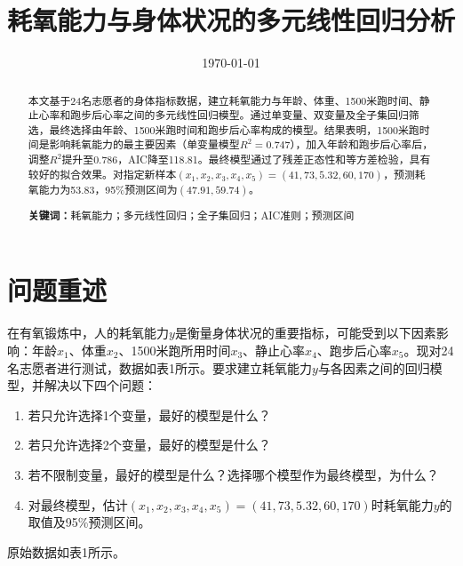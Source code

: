 \documentclass[12pt,a4paper]{article}
\begin{document}
\title{耗氧能力与身体状况的多元线性回归分析}
\date{\today}
\maketitle

\begin{abstract}
本文基于24名志愿者的身体指标数据，建立耗氧能力与年龄、体重、1500米跑时间、静止心率和跑步后心率之间的多元线性回归模型。通过单变量、双变量及全子集回归筛选，最终选择由年龄、1500米跑时间和跑步后心率构成的模型。结果表明，1500米跑时间是影响耗氧能力的最主要因素（单变量模型$R^2=0.747$），加入年龄和跑步后心率后，调整$R^2$提升至0.786，AIC降至118.81。最终模型通过了残差正态性和等方差检验，具有较好的拟合效果。对指定新样本$(x_1,x_2,x_3,x_4,x_5)=(41,73,5.32,60,170)$，预测耗氧能力为53.83，95\%预测区间为$(47.91,59.74)$。

\vspace{2mm}
\noindent\textbf{关键词：}耗氧能力；多元线性回归；全子集回归；AIC准则；预测区间
\end{abstract}

\section{问题重述}

在有氧锻炼中，人的耗氧能力$y$是衡量身体状况的重要指标，可能受到以下因素影响：年龄$x_1$、体重$x_2$、1500米跑所用时间$x_3$、静止心率$x_4$、跑步后心率$x_5$。现对24名志愿者进行测试，数据如表1所示。要求建立耗氧能力$y$与各因素之间的回归模型，并解决以下四个问题：

\begin{enumerate}[label=(\arabic*)]
\item 若只允许选择1个变量，最好的模型是什么？
\item 若只允许选择2个变量，最好的模型是什么？
\item 若不限制变量，最好的模型是什么？选择哪个模型作为最终模型，为什么？
\item 对最终模型，估计$(x_1,x_2,x_3,x_4,x_5)=(41,73,5.32,60,170)$时耗氧能力$y$的取值及95\%预测区间。
\end{enumerate}

原始数据如表1所示。
\end{document}
